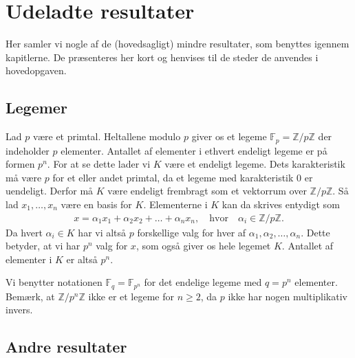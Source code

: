 \appendix

\chapter{Udeladte resultater}
Her samler vi nogle af de (hovedsagligt) mindre resultater, som benyttes igennem kapitlerne. De præsenteres her kort og henvises til de steder de anvendes i hovedopgaven.

\section{Legemer}
\label{appendiks_legemer}
Lad $p$ være et primtal. Heltallene modulo $p$ giver os et legeme $\mathbb{F}_p = \mathbb{Z}/p\mathbb{Z}$ der indeholder $p$ elementer. Antallet af elementer i ethvert endeligt legeme er på formen $p^n$. For at se dette lader vi $K$ være et endeligt legeme. Dets karakteristik må være $p$ for et eller andet primtal, da et legeme med karakteristik $0$ er uendeligt. Derfor må $K$ være endeligt frembragt som et vektorrum over $\mathbb{Z}/p\mathbb{Z}$. Så lad $x_1, \ldots, x_n$ være en basis for $K$. Elementerne i $K$ kan da skrives entydigt som
\begin{align*}
	x= \alpha_1 x_1 + \alpha_2 x_2 + \ldots + \alpha_n x_n, \quad \text{hvor} \quad \alpha_i \in \mathbb{Z}/p\mathbb{Z}.
\end{align*}
Da hvert $\alpha_i \in K$ har vi altså $p$ forskellige valg for hver af $\alpha_1, \alpha_2, \ldots, \alpha_n$. Dette betyder, at vi har $p^n$ valg for $x$, som også giver os hele legemet $K$. Antallet af elementer i $K$ er altså $p^n$. 

Vi benytter notationen $\mathbb{F}_q = \mathbb{F}_{p^n}$ for det endelige legeme med $q=p^n$ elementer. Bemærk, at $\mathbb{Z}/p^n \mathbb{Z}$ ikke er et legeme for $n \geq 2$, da $p$ ikke har nogen multiplikativ invers.

\section{Andre resultater}

